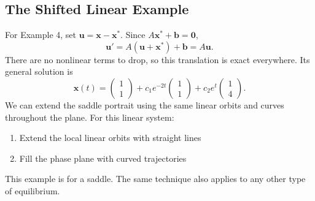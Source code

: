 \documentclass[10pt,letterpaper]{article}
\begin{document}
\subsection{The Shifted Linear Example}
For Example 4, set $\mathbf{u}=\mathbf{x}-\mathbf{x}^*$. Since $A\mathbf{x}^*+\mathbf{b}=\mathbf{0}$,
\[
\mathbf{u}'=A(\mathbf{u}+\mathbf{x}^*)+\mathbf{b}
=A\mathbf{u}.
\]
There are no nonlinear terms to drop, so this translation is exact everywhere. Its general solution is
\[
\mathbf{x}(t)=
\begin{pmatrix}1\\1\end{pmatrix}
+c_1e^{-2t}\begin{pmatrix}1\\1\end{pmatrix}
+c_2e^t\begin{pmatrix}1\\4\end{pmatrix}.
\]
We can extend the saddle portrait using the same linear orbits and curves throughout the plane. For this linear system:
\begin{enumerate}
    \item Extend the local linear orbits with straight lines
    \item Fill the phase plane with curved trajectories
\end{enumerate}
This example is for a saddle. The same technique also applies to any other type of equilibrium.
\end{document}

